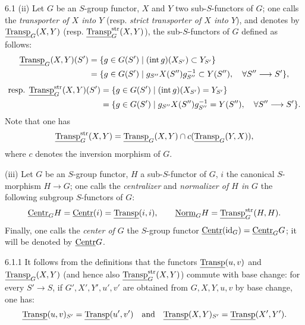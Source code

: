 \begin{definition}{6.1}
(ii) Let $G$ be an $S$-group functor, $X$ and $Y$ two sub-$S$-functors of $G$; one calls the \emph{transporter of $X$ into $Y$} (resp. \emph{strict transporter of $X$ into $Y$}), and denotes by $\underline{\operatorname{Transp}}_G(X,Y)$ (resp. $\underline{\operatorname{Transp}}_G^{\mathrm{str}}(X,Y)$), the sub-$S$-functors of $G$ defined as follows:
\[
\begin{aligned}
\underline{\operatorname{Transp}}_G(X,Y)(S')&=\{g\in G(S')\mid(\mathrm{int}\,g)(X_{S'})\subset Y_{S'}\}\\
&=\{g\in G(S')\mid g_{S''}X(S'')g_{S''}^{-1}\subset Y(S''),\quad\forall S''\longrightarrow S'\},
\end{aligned}
\]
\[
\begin{aligned}
\text{resp. }\underline{\operatorname{Transp}}_G^{\mathrm{str}}(X,Y)(S')&=\{g\in G(S')\mid(\mathrm{int}\,g)(X_{S'})=Y_{S'}\}\\
&=\{g\in G(S')\mid g_{S''}X(S'')g_{S''}^{-1}=Y(S''),\quad\forall S''\longrightarrow S'\}.
\end{aligned}
\]
Note that one has
\[
\underline{\operatorname{Transp}}_G^{\mathrm{str}}(X,Y)=\underline{\operatorname{Transp}}_G(X,Y)\cap c(\underline{\operatorname{Transp}}_G(Y,X)),
\]
where $c$ denotes the inversion morphism of $G$.

(iii) Let $G$ be an $S$-group functor, $H$ a sub-$S$-functor of $G$, $i$ the canonical $S$-morphism $H\to G$; one calls the \emph{centralizer} and \emph{normalizer of $H$ in $G$} the following subgroup $S$-functors of $G$:
\[
\underline{\mathrm{Centr}}_GH=\underline{\mathrm{Centr}}(i)=\underline{\operatorname{Transp}}(i,i),\qquad\underline{\mathrm{Norm}}_GH=\underline{\operatorname{Transp}}_G^{\mathrm{str}}(H,H).
\]
Finally, one calls the \emph{center of $G$} the $S$-group functor $\underline{\mathrm{Centr}}(\mathrm{id}_G)=\underline{\mathrm{Centr}}_GG$; it will be denoted by $\underline{\mathrm{Centr}} G$.
\end{definition}
\begin{remark}{6.1.1}\label{VIB.6.1.1}
It follows from the definitions that the functors $\underline{\operatorname{Transp}}(u,v)$ and $\underline{\operatorname{Transp}}_G(X,Y)$ (and hence also $\underline{\operatorname{Transp}}_G^{\mathrm{str}}(X,Y)$) commute with base change: for every $S'\to S$, if $G',X',Y',u',v'$ are obtained from $G,X,Y,u,v$ by base change, one has:
\[
\underline{\operatorname{Transp}}(u,v)_{S'}=\underline{\operatorname{Transp}}(u',v')\quad\text{and}\quad\underline{\operatorname{Transp}}(X,Y)_{S'}=\underline{\operatorname{Transp}}(X',Y').
\]
\end{remark}
